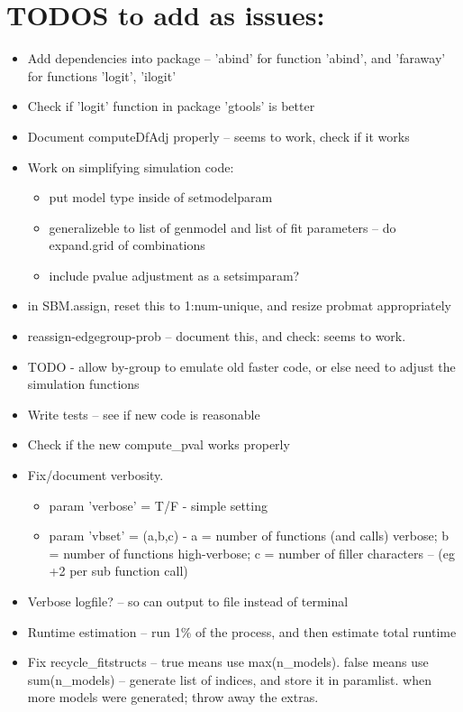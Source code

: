 \documentclass[11pt]{article}
\begin{document}
\section{TODOS to add as issues:}
\begin{itemize}
\item Add dependencies into package -- 'abind' for function 'abind', and 'faraway' for functions 'logit', 'ilogit'
\item Check if 'logit' function in package 'gtools' is better
\item Document computeDfAdj properly -- seems to work, check if it works
\item Work on simplifying simulation code: 
\begin{itemize}
\item put model type inside of setmodelparam
\item generalizeble to list of genmodel and list of fit parameters -- do expand.grid of combinations
\item include pvalue adjustment as a setsimparam?
\end{itemize}
\item in SBM.assign, reset this to 1:num-unique, and resize probmat appropriately
\item reassign-edgegroup-prob -- document this, and check: seems to work. 
\item TODO - allow by-group to emulate old faster code, or else need to adjust the simulation functions
\item Write tests -- see if new code is reasonable
\item Check if the new compute\_pval works properly
\item Fix/document verbosity. 
\begin{itemize}
\item param 'verbose' = T/F - simple setting
\item param 'vbset' = (a,b,c) - a = number of functions (and calls) verbose; b = number of functions high-verbose; c = number of filler characters -- (eg +2 per sub function call)
\end{itemize}
\item Verbose logfile? -- so can output to file instead of terminal
\item Runtime estimation -- run 1\% of the process, and then estimate total runtime
\item Fix recycle\_fitstructs -- true means use max(n\_models). false means use sum(n\_models) -- generate list of indices, and store it in paramlist. when more models were generated; throw away the extras. 

\end{itemize}
\end{document}
